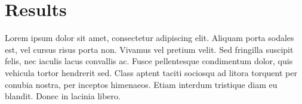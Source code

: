 \documentclass[usenatbib]{mnras}
\begin{document}
    




\section{Results}
 Lorem ipsum dolor sit amet, consectetur adipiscing elit. Aliquam porta sodales est, vel cursus risus porta non. Vivamus vel pretium velit. Sed fringilla suscipit felis, nec iaculis lacus convallis ac. Fusce pellentesque condimentum dolor, quis vehicula tortor hendrerit sed. Class aptent taciti sociosqu ad litora torquent per conubia nostra, per inceptos himenaeos. Etiam interdum tristique diam eu blandit. Donec in lacinia libero.
\end{document}
